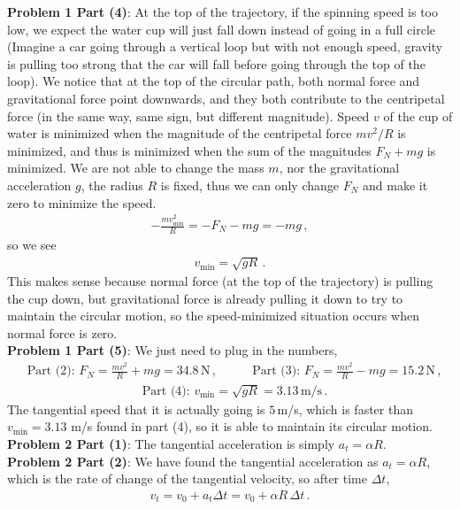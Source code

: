 \documentclass[11pt]{article}
\begin{document}
\textbf{Problem 1 Part (4)}: At the top of the trajectory, if the spinning speed is too low, we expect the water cup will just fall down instead of going in a full circle (Imagine a car going through a vertical loop but with not enough speed, gravity is pulling too strong that the car will fall before going through the top of the loop). We notice that at the top of the circular path, both normal force and gravitational force point downwards, and they both contribute to the centripetal force (in the same way, same sign, but different magnitude). Speed $v$ of the cup of water is minimized when the magnitude of the centripetal force $mv^2/R$ is minimized, and thus is minimized when the sum of the magnitudes $F_N + mg$ is minimized. We are not able to change the mass $m$, nor the gravitational acceleration $g$, the radius $R$ is fixed, thus we can only change $F_N$ and make it zero to minimize the speed. 
\begin{align*}
-\frac{mv^2_{\min}}{R} = -F_N - mg = -mg \,,
\end{align*}
so we see
\begin{align*}
v_{\min} = \sqrt{gR}\,.
\end{align*}
This makes sense because normal force (at the top of the trajectory) is pulling the cup down, but gravitational force is already pulling it down to try to maintain the circular motion, so the speed-minimized situation occurs when normal force is zero. \\

\textbf{Problem 1 Part (5)}: We just need to plug in the numbers, 
\begin{align*}
&\text{Part (2): }F_N = \frac{mv^2}{R} + mg = 34.8\,\text{N}\,,\qquad
&\text{Part (3): }F_N = \frac{mv^2}{R} - mg = 15.2\,\text{N}\,,
\end{align*}
\begin{align*}
&\text{Part (4): }v_{\min} = \sqrt{gR} =3.13 \,\text{m/s}\,.
\end{align*}
The tangential speed that it is actually going is $5\,$m/s, which is faster than $v_{\min} = 3.13$ m/s found in part (4), so it is able to maintain its circular motion. \\

\textbf{Problem 2 Part (1)}: The tangential acceleration is simply $a_t = \alpha R$. \\

\textbf{Problem 2 Part (2)}: We have found the tangential acceleration as $a_t = \alpha R$, which is the rate of change of the tangential velocity, so after time $\Delta t$, 
\begin{align*}
v_t = v_0 + a_t\Delta t = v_0 + \alpha R\, \Delta t\,.
\end{align*}
\end{document}
